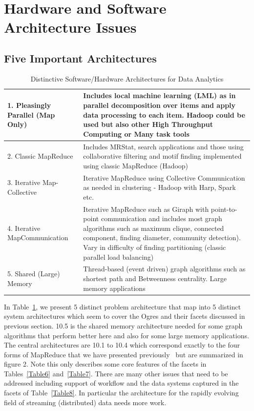 \documentclass{acm_proc_article-sp}
\begin{document}
\section{Hardware and Software Architecture Issues}
\subsection{Five Important Architectures}

\begin{table}[h]
\centering
\caption{Distinctive Software/Hardware Architectures for Data Analytics}
\label{Table10}
\begin{tabular}{|p{2.55cm}|p{5.45cm}|} \hline
1. Pleasingly Parallel (Map Only) & Includes local machine learning (LML) as in parallel decomposition over items and apply data processing to each item. Hadoop could be used but also other High Throughput Computing or Many task tools \\ \hline
2. Classic Map\-Reduce & Includes MRStat, search applications and those using collaborative filtering and motif finding implemented using classic MapReduce (Hadoop)\\ \hline
3. Iterative Map-Collective & Iterative MapReduce using Collective Communication as needed in clustering - Hadoop with Harp, Spark etc. \\ \hline
4. Iterative Map\-Communi\-cation & Iterative MapReduce such as Giraph with point-to-point communication and includes most graph algorithms such as maximum clique,  connected component, finding diameter, community detection). Vary in difficulty of finding partitioning (classic parallel load balancing)\\ \hline
5. Shared (Lar\-ge) Memory & Thread-based (event driven) graph algorithms such as shortest path and Betweenness centrality. Large memory applications
 
\\ \hline
\end{tabular}
\end{table}

In Table~\ref{Table10}, we present 5 distinct problem architecture
that map into 5 distinct system architectures which seem to cover the
Ogres and their facets discussed in previous section. 10.5 is the
shared memory architecture needed for some graph algorithms that
perform better here and also for some large memory applications. The
central architectures are 10.1 to 10.4 which correspond exactly to the
four forms of MapReduce that we have presented previously~\cite{b18}
but are summarized in figure 2. Note this only describes some core
features of the facets in Tables~\ref{Table6} and~\ref{Table7}. There
are many other issues that need to be addressed including support of
workflow and the data systems captured in the facets of
Table~\ref{Table8}. In particular the architecture for the rapidly
evolving field of streaming (distributed) data needs more work.
\end{document}
